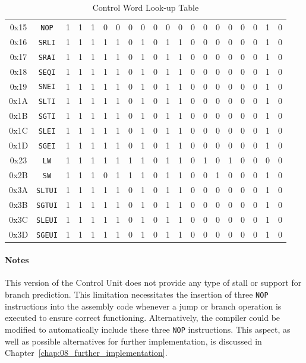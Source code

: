 \begin{table}[!htbp]
\begin{tabular}{|c|c|cccccccccccccccccc|}
		0x15 & \texttt{NOP} & 1 & 1 & 1 & 0 & 0 & 0 & 0 & 0 & 0 & 0 & 0 & 0 & 0 & 0 & 0 & 0 & 1 & 0 \\
		0x16 & \texttt{SRLI} & 1 & 1 & 1 & 1 & 1 & 0 & 1 & 0 & 1 & 1 & 0 & 0 & 0 & 0 & 0 & 0 & 1 & 0 \\
		0x17 & \texttt{SRAI} & 1 & 1 & 1 & 1 & 1 & 0 & 1 & 0 & 1 & 1 & 0 & 0 & 0 & 0 & 0 & 0 & 1 & 0 \\
		0x18 & \texttt{SEQI} & 1 & 1 & 1 & 1 & 1 & 0 & 1 & 0 & 1 & 1 & 0 & 0 & 0 & 0 & 0 & 0 & 1 & 0 \\
		0x19 & \texttt{SNEI} & 1 & 1 & 1 & 1 & 1 & 0 & 1 & 0 & 1 & 1 & 0 & 0 & 0 & 0 & 0 & 0 & 1 & 0 \\
		0x1A & \texttt{SLTI} & 1 & 1 & 1 & 1 & 1 & 0 & 1 & 0 & 1 & 1 & 0 & 0 & 0 & 0 & 0 & 0 & 1 & 0 \\
		0x1B & \texttt{SGTI} & 1 & 1 & 1 & 1 & 1 & 0 & 1 & 0 & 1 & 1 & 0 & 0 & 0 & 0 & 0 & 0 & 1 & 0 \\
		0x1C & \texttt{SLEI} & 1 & 1 & 1 & 1 & 1 & 0 & 1 & 0 & 1 & 1 & 0 & 0 & 0 & 0 & 0 & 0 & 1 & 0 \\
		0x1D & \texttt{SGEI} & 1 & 1 & 1 & 1 & 1 & 0 & 1 & 0 & 1 & 1 & 0 & 0 & 0 & 0 & 0 & 0 & 1 & 0 \\
		0x23 & \texttt{LW} & 1 & 1 & 1 & 1 & 1 & 1 & 1 & 0 & 1 & 1 & 0 & 1 & 0 & 1 & 0 & 0 & 0 & 0 \\
		0x2B & \texttt{SW} & 1 & 1 & 1 & 0 & 1 & 1 & 1 & 0 & 1 & 1 & 0 & 0 & 1 & 0 & 0 & 0 & 1 & 0 \\
		0x3A & \texttt{SLTUI} & 1 & 1 & 1 & 1 & 1 & 0 & 1 & 0 & 1 & 1 & 0 & 0 & 0 & 0 & 0 & 0 & 1 & 0 \\
		0x3B & \texttt{SGTUI} & 1 & 1 & 1 & 1 & 1 & 0 & 1 & 0 & 1 & 1 & 0 & 0 & 0 & 0 & 0 & 0 & 1 & 0 \\
		0x3C & \texttt{SLEUI} & 1 & 1 & 1 & 1 & 1 & 0 & 1 & 0 & 1 & 1 & 0 & 0 & 0 & 0 & 0 & 0 & 1 & 0 \\
		0x3D & \texttt{SGEUI} & 1 & 1 & 1 & 1 & 1 & 0 & 1 & 0 & 1 & 1 & 0 & 0 & 0 & 0 & 0 & 0 & 1 & 0 \\
		\hline
	\end{tabular}
 	\caption{Control Word Look-up Table}
	\label{tab:cw_lut}
\end{table}

\paragraph{Notes}
This version of the Control Unit does not provide any type of stall or support for branch prediction. This limitation necessitates the insertion of three \texttt{NOP} instructions into the assembly code whenever a jump or branch operation is executed to ensure correct functioning. Alternatively, the compiler could be modified to automatically include these three \texttt{NOP} instructions. This aspect, as well as possible alternatives for further implementation, is discussed in Chapter~\ref{chap:08_further_implementation}.